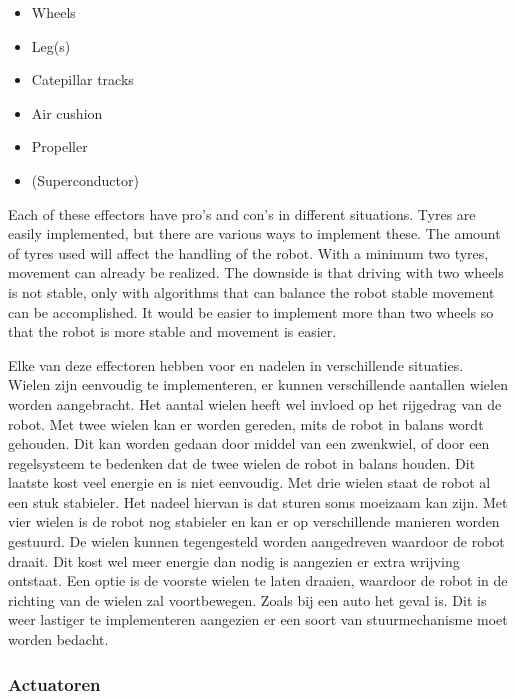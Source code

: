 \documentclass[10pt,a4paper]{article}
\begin{document}

\begin{itemize}
\item Wheels
\item Leg(s)
\item Catepillar tracks
\item Air cushion  
\item Propeller 
\item (Superconductor)
\end{itemize}

Each of these effectors have pro's and con's in different situations. Tyres are easily implemented, but there are various ways to implement these. The amount of tyres used will affect the handling of the robot. With a minimum two tyres, movement can already be realized. The downside is that driving with two wheels is not stable, only with algorithms that can balance the robot stable movement can be accomplished. It would be easier to implement more than two wheels so that the robot is more stable and movement is easier. 


  
Elke van deze effectoren hebben voor en nadelen in verschillende situaties.\\Wielen zijn eenvoudig te implementeren, er kunnen verschillende aantallen wielen worden aangebracht. Het aantal wielen heeft wel invloed op het rijgedrag van de robot. Met twee wielen kan er worden gereden, mits de robot in balans wordt gehouden. Dit kan worden gedaan door middel van een zwenkwiel, of door een regelsysteem te bedenken dat de twee wielen de robot in balans houden. Dit laatste kost veel energie en is niet eenvoudig. Met drie wielen staat de robot al een stuk stabieler. Het nadeel hiervan is dat sturen soms moeizaam kan zijn. Met vier wielen is de robot nog stabieler en kan er op verschillende manieren worden gestuurd. De wielen kunnen tegengesteld worden aangedreven waardoor de robot draait. Dit kost wel meer energie dan nodig is aangezien er extra wrijving ontstaat. Een optie is de voorste wielen te laten draaien, waardoor de robot in de richting van de wielen zal voortbewegen. Zoals bij een auto het geval is. Dit is weer lastiger te implementeren aangezien er een soort van stuurmechanisme moet worden bedacht. 

\subsubsection{Actuatoren}
\end{document}
